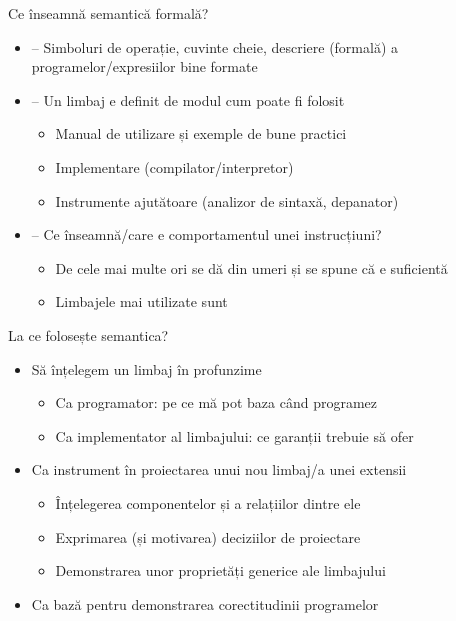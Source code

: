 \documentclass[xcolor=pdftex,romanian,colorlinks]{beamer}
\begin{document}
\begin{frame}{Ce înseamnă semantică formală?}

\medskip  
\begin{itemize}
	\item {} -- Simboluri de operație, cuvinte cheie, descriere (formală) a programelor/expresiilor bine formate
	\medskip	 
	\item {} -- Un limbaj e definit de modul cum poate fi folosit 
	\begin{itemize}
		\item Manual de utilizare și exemple de bune practici
		\item Implementare (compilator/interpretor)
		\item Instrumente ajutătoare (analizor de sintaxă, depanator)
	\end{itemize}
	\medskip  
	\item {} -- Ce înseamnă/care e comportamentul unei instrucțiuni?
	\begin{itemize}
	\item De cele mai multe ori se dă din umeri și se spune că  e suficientă 
	\item Limbajele mai utilizate sunt 
	\end{itemize}

\end{itemize}
\end{frame}

\begin{frame}{La ce folosește semantica?}
\begin{itemize}
	\item Să înțelegem un limbaj în profunzime
	\begin{itemize}
		\item Ca programator: pe ce mă pot baza când programez
		\item Ca implementator al limbajului: ce garanții trebuie să ofer
	\end{itemize}
	\medskip  
	\item Ca instrument în proiectarea unui nou limbaj/a unei extensii 
	\begin{itemize}
		\item \^Ințelegerea componentelor și a relațiilor dintre ele
		\item Exprimarea (și motivarea) deciziilor de proiectare 
		\item Demonstrarea unor proprietăți generice ale limbajului 	
	\end{itemize}
	\medskip  
	\item Ca bază pentru demonstrarea corectitudinii programelor
\end{itemize}
\end{frame}
\end{document}
